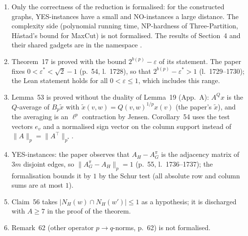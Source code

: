 \documentclass[10pt,a4paper]{article}
\newcommand{\lean}[1]{\textcolor{blue!50!black}{\texttt{\detokenize{#1}}}}
\begin{document}
\begin{enumerate}[leftmargin=*]
\item Only the correctness of the reduction is formalised: for the constructed graphs, YES-instances have a small and NO-instances a large distance. The complexity side (polynomial running time, NP-hardness of Three-Partition, H\aa{}stad's bound for MaxCut) is not formalised. The results of Section~4 and their shared gadgets are in the namespace \lean{GsimOT.Hardness}.
\item Theorem~17 is proved with the bound $2^{b(p)}-\varepsilon$ of its statement. The paper fixes $0<\varepsilon^*<\sqrt2-1$ (p.~54, l.~1728), so that $2^{b(p)}-\varepsilon^*>1$ (l.~1729--1730); the Lean statement holds for all $0<\varepsilon\le1$, which includes this range.
\item Lemma~53 is proved without the duality of Lemma~19 (App.~A): $A^Qx$ is the $Q$-average of $B_p\tilde x$ with $\tilde x(v,w)=Q(v,w)^{1/p}x(v)$ (the paper's $\tilde x$), and the averaging is an $\ell^p$ contraction by Jensen. Corollary~54 uses the test vectors $e_v$ and a normalised sign vector on the column support instead of $\|A\|_p=\|A^\top\|_{p^*}$.
\item YES-instances: the paper observes that $A_H-A^\pi_G$ is the adjacency matrix of $3m$ disjoint edges, so $\|A^\pi_G-A_H\|_p=1$ (p.~55, l.~1736--1737); the formalisation bounds it by $1$ by the Schur test (all absolute row and column sums are at most $1$).
\item Claim~56 takes $|N_H(w)\cap N_H(w')|\le1$ as a hypothesis; it is discharged with $A\ge7$ in the proof of the theorem.
\item Remark~62 (other operator $p\to q$-norms, p.~62) is not formalised.
\end{enumerate}
\end{document}
